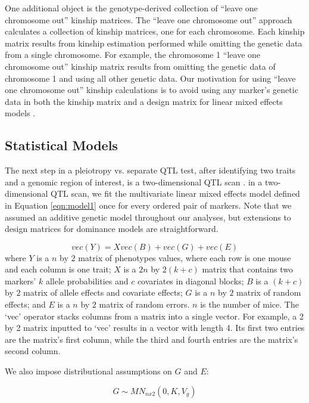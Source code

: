 \documentclass[12pt,twoside, lineno]{gsajnl}
\begin{document}
One additional object is the genotype-derived collection of ``leave
one chromosome out'' kinship matrices. The ``leave one chromosome
out'' approach calculates a collection of kinship matrices, one for
each chromosome. Each kinship matrix results from kinship estimation
performed while omitting the genetic data from a single chromosome.
For example, the chromosome 1 ``leave one chromosome out'' kinship
matrix results from omitting the genetic data of chromosome 1 and
using all other genetic data. Our motivation for using ``leave one
chromosome out'' kinship calculations is to avoid using any marker's
genetic data in both the kinship matrix and a design matrix for linear
mixed effects models \citep{yang2014advantages}.




\subsection{Statistical Models}

The next step in a pleiotropy vs. separate QTL test, after identifying
two traits and a genomic region of interest, is a two-dimensional QTL
scan \citep{jiang1995multiple}. in a two-dimensional QTL scan, we fit
the multivariate linear mixed effects model defined in Equation
\ref{eqn:model1} once for every ordered pair of markers. Note that we
assumed an additive genetic model throughout our analyses, but
extensions to design matrices for dominance models are
straightforward.


\begin{equation}
vec(Y) = X vec(B) + vec(G) + vec(E)
\label{eqn:model1}
\end{equation}
where $Y$ is a $n$ by $2$ matrix of phenotypes values, where each row
is one mouse and each column is one trait; $X$ is a $2n$ by $2(k + c)$
matrix that contains two markers' $k$ allele probabilities and $c$
covariates in diagonal blocks; $B$ is a $(k + c)$ by $2$ matrix of
allele effects and covariate effects; $G$ is a $n$ by $2$ matrix of
random effects; and $E$ is a $n$ by $2$ matrix of random errors. $n$
is the number of mice. The `vec' operator stacks columns from a matrix
into a single vector. For example, a 2 by 2 matrix inputted to `vec'
results in a vector with length 4. Its first two entries are the
matrix's first column, while the third and fourth entries are the
matrix's second column.


We also impose distributional assumptions on $G$ and $E$:

\begin{equation}
G \sim MN_{n x 2}(0, K, V_g)
\label{eqn:model2}
\end{equation}
\end{document}
